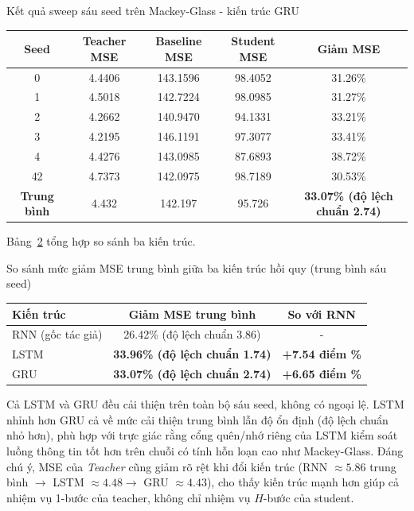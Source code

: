 \begin{table}[H]{Kết quả sweep sáu seed trên Mackey-Glass - kiến trúc GRU}
	\label{bang:mg-gru}
	\centering
	\begin{tabular}{cccc c}
		\toprule
		\textbf{Seed} & \textbf{Teacher MSE} & \textbf{Baseline MSE} & \textbf{Student MSE} & \textbf{Giảm MSE} \\
		\midrule
		0  & 4.4406 & 143.1596 & 98.4052 & 31.26\% \\
		1  & 4.5018 & 142.7224 & 98.0985 & 31.27\% \\
		2  & 4.2662 & 140.9470 & 94.1331 & 33.21\% \\
		3  & 4.2195 & 146.1191 & 97.3077 & 33.41\% \\
		4  & 4.4276 & 143.0985 & 87.6893 & 38.72\% \\
		42 & 4.7373 & 142.0975 & 98.7189 & 30.53\% \\
		\midrule
		\textbf{Trung bình} & 4.432 & 142.197 & 95.726 & \textbf{33.07\% (độ lệch chuẩn 2.74)} \\
		\bottomrule
	\end{tabular}
\end{table}

Bảng~\ref{bang:mg-sosanh-kientruc} tổng hợp so sánh ba kiến trúc.

\begin{table}[H]{So sánh mức giảm MSE trung bình giữa ba kiến trúc hồi quy (trung bình sáu seed)}
	\label{bang:mg-sosanh-kientruc}
	\centering
	\begin{tabular}{lcc}
		\toprule
		\textbf{Kiến trúc} & \textbf{Giảm MSE trung bình} & \textbf{So với RNN} \\
		\midrule
		RNN (gốc tác giả) & 26.42\% (độ lệch chuẩn 3.86) & - \\
		LSTM & \textbf{33.96\% (độ lệch chuẩn 1.74)} & \textbf{+7.54 điểm \%} \\
		GRU & \textbf{33.07\% (độ lệch chuẩn 2.74)} & \textbf{+6.65 điểm \%} \\
		\bottomrule
	\end{tabular}
\end{table}

Cả LSTM và GRU đều cải thiện trên toàn bộ sáu seed, không có ngoại lệ. LSTM nhỉnh hơn GRU cả về
mức cải thiện trung bình lẫn độ ổn định (độ lệch chuẩn nhỏ hơn), phù hợp với trực giác rằng cổng
quên/nhớ riêng của LSTM kiểm soát luồng thông tin tốt hơn trên chuỗi có tính hỗn loạn cao như
Mackey-Glass. Đáng chú ý, MSE của \textit{Teacher} cũng giảm rõ rệt khi đổi kiến trúc (RNN
$\approx 5.86$ trung bình $\to$ LSTM $\approx 4.48 \to$ GRU $\approx 4.43$), cho thấy kiến trúc
mạnh hơn giúp cả nhiệm vụ 1-bước của teacher, không chỉ nhiệm vụ $H$-bước của student.

